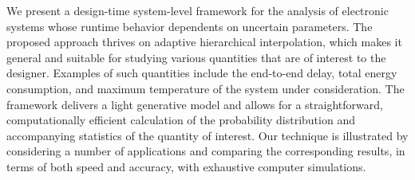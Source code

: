 We present a design-time system-level framework for the analysis of electronic
systems whose runtime behavior dependents on uncertain parameters. The proposed
approach thrives on adaptive hierarchical interpolation, which makes it general
and suitable for studying various quantities that are of interest to the
designer. Examples of such quantities include the end-to-end delay, total energy
consumption, and maximum temperature of the system under consideration. The
framework delivers a light generative model and allows for a straightforward,
computationally efficient calculation of the probability distribution and
accompanying statistics of the quantity of interest. Our technique is
illustrated by considering a number of applications and comparing the
corresponding results, in terms of both speed and accuracy, with exhaustive
computer simulations.
